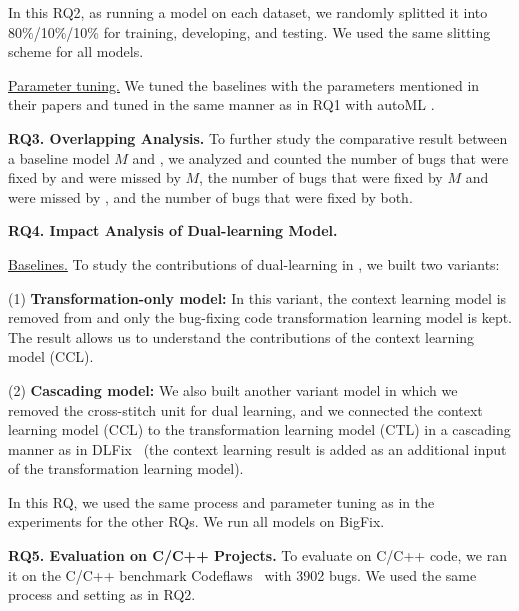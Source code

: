 

In this RQ2, as running a model on each dataset, we randomly splitted
it into 80\%/10\%/10\% for training, developing, and testing. We used
the same slitting scheme for all models.


\underline{Parameter tuning.} We tuned the baselines with the
parameters mentioned in their papers and tuned {\tool} in the same
manner as in RQ1 with autoML \cite{NNI}.

{\bf RQ3. Overlapping Analysis.} To further study the comparative
result between a baseline model $M$ and {\tool}, we analyzed and
counted the number of bugs that were fixed by {\tool} and were missed
by $M$, the number of bugs that were fixed by $M$ and were missed
by {\tool}, and the number of bugs that were fixed by both.


{\bf RQ4. Impact Analysis of Dual-learning Model.}

\underline{Baselines.} To study the contributions of dual-learning in
{\tool}, we built two variants:

(1) \textbf{Transformation-only model:} In this variant, the
context learning model is removed from {\tool} and only the bug-fixing
code transformation learning model is kept. The result allows us to
understand the contributions of the context learning model (CCL).


(2) \textbf{Cascading model:} We also built another variant model in
which we removed the cross-stitch unit for dual learning, and we
connected the context learning model (CCL) to the transformation
learning model (CTL) in a cascading manner as in DLFix~\cite{icse20}
(the context learning result is added as an additional input of the
transformation learning model).


In this RQ, we used the same process and parameter tuning as in the
experiments for the other RQs. We run all models on BigFix.


{\bf RQ5. Evaluation on C/C++ Projects.}  To evaluate {\tool} on C/C++
code, we ran it on the C/C++ benchmark
Codeflaws~\cite{tan2017codeflaws} with 3902 bugs. 
We used the same process and setting as in RQ2.
